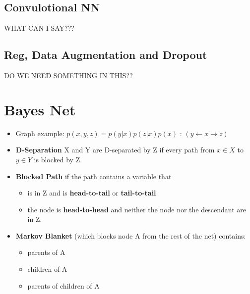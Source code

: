  
\subsection{Convulotional NN} 

{\color{red} WHAT CAN I SAY???}

 
\subsection{Reg, Data Augmentation and Dropout}

{\color{red} DO WE NEED SOMETHING IN THIS??}


\section{Bayes Net}
\begin{itemize}
	\item Graph example: $p(x, y, z) = p(y | x) p(z | x) p(x)$ : $(y \leftarrow x \rightarrow z)$ 
	\item \textbf{D-Separation} X and Y are D-separated by Z if every path from $ x \in X$ to $y \in Y$ is blocked by Z.
	\item \textbf{Blocked Path} if the path contains a variable that
	\begin{itemize}
		\item is in Z and is \textbf{head-to-tail} or \textbf{tail-to-tail}
		\item the node is \textbf{head-to-head} and neither the node nor the descendant are in Z.
	\end{itemize}	
	\item \textbf{Markov Blanket} (which blocks node A from the rest of the net) contains:
	\begin{itemize}
		\item parents of A
		\item children of A
		\item parents of children of A
	\end{itemize}
	
\end{itemize}






